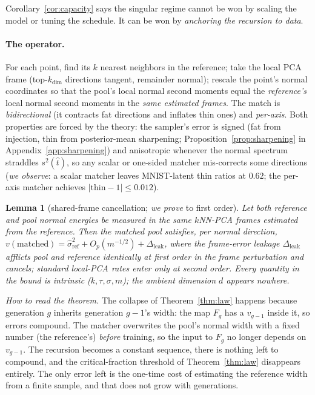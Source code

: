 \documentclass[11pt]{article}
\newtheorem{lemma}{Lemma}
\theoremstyle{remark}
\begin{document}
Corollary~\ref{cor:capacity} says the singular regime cannot be won by scaling the
model or tuning the schedule. It can be won by \emph{anchoring the recursion to data}.

\paragraph{The operator.} For each point, find its $k$ nearest neighbors in the
reference; take the local PCA frame (top-$k_{\dim}$ directions tangent, remainder
normal); rescale the point's normal coordinates so that the pool's local normal
second moments equal the \emph{reference's} local normal second moments in the
\emph{same estimated frames}. The match is \emph{bidirectional} (it contracts fat
directions and inflates thin ones) and \emph{per-axis}. Both properties are forced by
the theory: the sampler's error is signed (fat from injection, thin from posterior-mean
sharpening; Proposition~\ref{prop:sharpening} in Appendix~\ref{app:sharpening}) and
anisotropic whenever the normal spectrum straddles $s^2(\hat t)$, so any scalar or
one-sided matcher mis-corrects some directions (\emph{we observe}: a scalar matcher
leaves MNIST-latent thin ratios at $0.62$; the per-axis matcher achieves
$|\text{thin}-1|\le0.012$).

\begin{lemma}[shared-frame cancellation; \emph{we prove} to first order]\label{lem:frames}
Let both reference and pool normal energies be measured in the same $k$NN-PCA frames
estimated from the reference. Then the matched pool satisfies, per normal direction,
$v(\mathrm{matched})=\hat\sigma^2_{\mathrm{ref}}+O_p(m^{-1/2})+\Delta_{\mathrm{leak}}$,
where the frame-error leakage $\Delta_{\mathrm{leak}}$ afflicts pool and reference
\emph{identically} at first order in the frame perturbation and cancels; standard
local-PCA rates \citep{aamari2019nonasymptotic,singer2012vector} enter only at second
order. Every quantity in the bound is intrinsic ($k,\tau,\sigma,m$); the ambient
dimension $d$ appears nowhere.
\end{lemma}

\emph{How to read the theorem.} The collapse of Theorem~\ref{thm:law} happens because
generation $g$ inherits generation $g\!-\!1$'s width: the map $F_g$ has a $v_{g-1}$ inside
it, so errors compound. The matcher overwrites the pool's normal width with a fixed number
(the reference's) \emph{before} training, so the input to $F_g$ no longer depends on
$v_{g-1}$. The recursion becomes a constant sequence, there is nothing left to compound,
and the critical-fraction threshold of Theorem~\ref{thm:law} disappears entirely. The only
error left is the one-time cost of estimating the reference width from a finite sample, and
that does not grow with generations.
\end{document}

